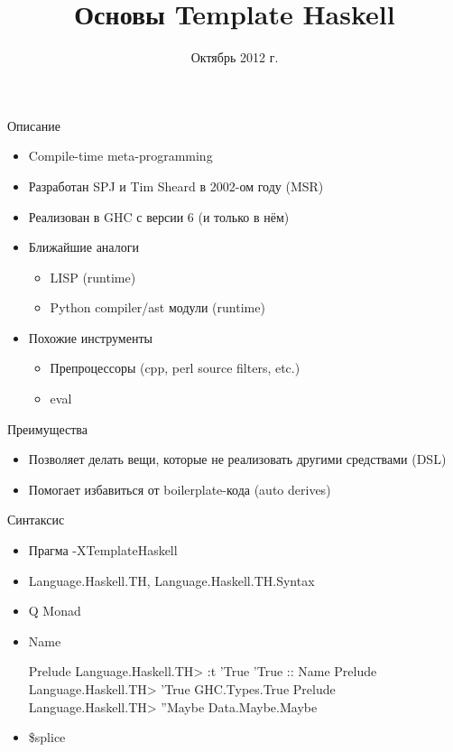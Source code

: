 \documentclass{beamer}
\begin{document}

\title{Основы Template Haskell}
\date{Октябрь 2012 г.}
\maketitle

\begin{frame}{Описание}
\begin{itemize}
    \item Compile-time meta-programming
    \item Разработан SPJ и Tim Sheard в 2002-ом году (MSR)
    \item Реализован в GHC с версии 6 (и только в нём)
    \item Ближайшие аналоги
    \begin{itemize}
        \item LISP (runtime)
        \item Python compiler/ast модули (runtime)
    \end{itemize}
    \item Похожие инструменты
    \begin{itemize}
        \item Препроцессоры (cpp, perl source filters, etc.)
        \item eval
    \end{itemize}
\end{itemize}
\end{frame}

\begin{frame}{Преимущества}
\begin{itemize}
    \item Позволяет делать вещи, которые
    не реализовать другими средствами (DSL)
    \item Помогает избавиться от boilerplate-кода (auto derives)
\end{itemize}
\end{frame}

\begin{frame}[fragile]{Синтаксис}
\begin{itemize}
    \item Прагма -XTemplateHaskell
    \item Language.Haskell.TH, Language.Haskell.TH.Syntax
    \item Q Monad
    \item Name
    \begin{haskellcode}
    Prelude Language.Haskell.TH> :t 'True
    'True :: Name
    Prelude Language.Haskell.TH> 'True
    GHC.Types.True
    Prelude Language.Haskell.TH> ''Maybe
    Data.Maybe.Maybe
    \end{haskellcode}
    \item \$splice
\end{itemize}
\end{frame}
\end{document}
